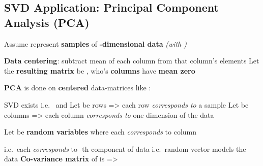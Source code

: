 \subsection*{SVD Application: Principal Component Analysis (PCA)}

Assume 
represent \textbf{ samples} of \textbf{-dimensional
      data} \emph{(with )}

\begin{itemize}

      \vItem
            \textbf{Data centering}: subtract mean of each column from that
            column's elements
      \vItem
            Let the \textbf{resulting matrix} be
            , who's \textbf{columns} have
            \textbf{mean zero}
\end{itemize}

\textbf{PCA} is done on \textbf{centered} data-matrices like
:

\begin{itemize}

      \vItem
            SVD exists i.e.~ and 
      \vItem
            Let  be rows
            =\textgreater{} each row \emph{corresponds to} a sample
      \vItem
            Let  be columns
            =\textgreater{} each column \emph{corresponds to} one dimension of
            the data
\end{itemize}

Let  be \textbf{random variables} where
each  \emph{corresponds} to column 

\begin{itemize}

      \vItem
            i.e.~each  \emph{corresponds} to -th component
            of data
      \vItem
            i.e.~random vector  models the
            data 
      \vItem
            \textbf{Co-variance matrix} of  is
             =\textgreater{}
\end{itemize}

